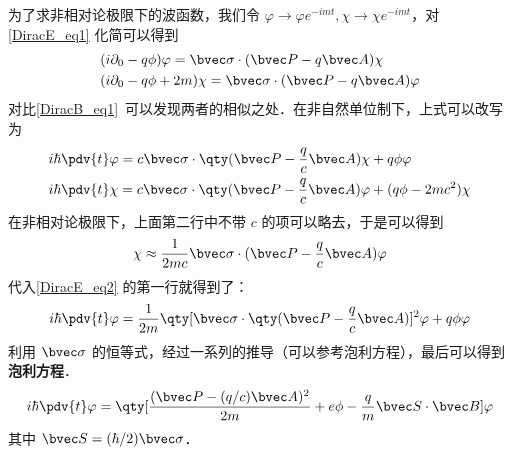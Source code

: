 为了求非相对论极限下的波函数，我们令 $\varphi\rightarrow \varphi e^{-imt},\chi\rightarrow \chi e^{-imt}$，对 \autoref{DiracE_eq1} 化简可以得到
\begin{equation}\label{DiracE_eq5}
\begin{aligned}
&(i\partial_0 - q \phi)\varphi = \bvec \sigma\cdot (\bvec P-q\bvec A) \chi\\
&(i\partial_0 - q \phi + 2m) \chi = \bvec \sigma\cdot (\bvec P-q\bvec A)  \varphi
\end{aligned}
\end{equation}
对比\autoref{DiracB_eq1}~可以发现两者的相似之处．在非自然单位制下，上式可以改写为
\begin{equation}\label{DiracE_eq2}
\begin{aligned}
&i\hbar \pdv{t} \varphi = c\bvec \sigma\cdot \qty(\bvec P-\frac{q}{c}\bvec A)\chi + q \phi \varphi\\
&i\hbar\pdv{t} \chi = c \bvec \sigma\cdot \qty(\bvec P-\frac{q}{c}\bvec A) \varphi + (q \phi-2mc^2) \chi
\end{aligned}
\end{equation}
在非相对论极限下，上面第二行中不带 $c$ 的项可以略去，于是可以得到
\begin{equation}
\chi\approx \frac{1}{2mc} \bvec \sigma \cdot(\bvec P-\frac{q}{c}\bvec A)\varphi
\end{equation}
代入\autoref{DiracE_eq2} 的第一行就得到了：
\begin{equation}
i\hbar\pdv{t} \varphi = \frac{1}{2m}\qty[\bvec \sigma \cdot\qty(\bvec P - \frac{q}{c}\bvec A)]^2 \varphi + q\phi  \varphi
\end{equation}
利用 $\bvec \sigma$ 的恒等式，经过一系列的推导（可以参考泡利方程），最后可以得到\textbf{泡利方程}．
\begin{equation}
i\hbar\pdv{t} \varphi = \qty[\frac{(\bvec P - (q/c)\bvec A)^2}{2m}+e\phi-\frac{q}{m}\bvec S\cdot \bvec B]\varphi
\end{equation}
其中 $\bvec S=(\hbar/2)\bvec \sigma$．
